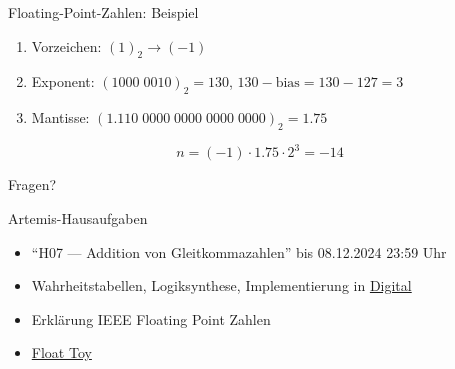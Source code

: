\documentclass[
  german,            %
  aspectratio=169,    %
]{tumbeamer}
\begin{document}
\begin{frame}[c]{Floating-Point-Zahlen: Beispiel}
	\begin{center}
		\vspace{0.3cm}
		\begin{enumerate}
			\item Vorzeichen: $(1)_2 \rightarrow (-1)$
			\item Exponent: $(1000\;0010)_2 = 130$, $130-\textrm{bias} = 130-127 = 3$
			\item Mantisse: $(1.110\;0000\;0000\;0000\;0000)_2 = 1.75$
		\end{enumerate}
		\vspace{0.3cm}
		\Large
		\[
			n = (-1) \cdot 1.75 \cdot 2^3 = -14
		\]
	\end{center}
\end{frame}



\begin{frame}[c, fragile]{}{}
	\begin{center}
		\LARGE Fragen?
	\end{center}
\end{frame}

\begin{frame}[c, fragile]{Artemis-Hausaufgaben}{}
	\begin{itemize}
		\item \enquote{H07 --- Addition von Gleitkommazahlen} bis 08.12.2024 23:59 Uhr
		\item Wahrheitstabellen, Logiksynthese, Implementierung in \href{https://github.com/hneemann/Digital}{Digital}
		\item Erklärung IEEE Floating Point Zahlen
		\item \href{https://evanw.github.io/float-toy/l}{Float Toy}
	\end{itemize}
\end{frame}
\end{document}
